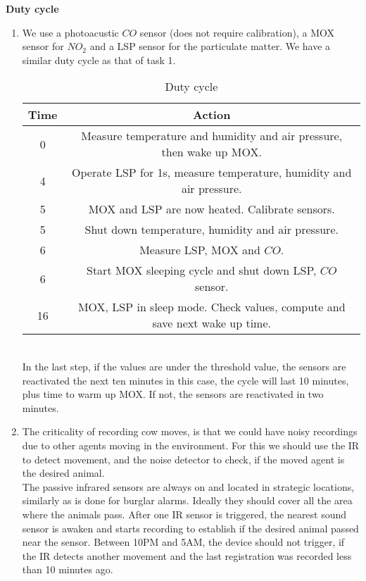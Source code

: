 \documentclass[a4paper, 12pt]{article}
\begin{document}
\begin{exercise}
\textbf{Duty cycle}
\begin{enumerate}
	\item We use a photoacustic $CO$ sensor (does not require calibration),
		a MOX sensor for  $NO_2$ and a LSP
		sensor for the particulate matter. We have a similar duty cycle as that
		of task 1.\\
	\begin{table}[htpb]
		\centering
		\caption{Duty cycle}
		\label{tab:label}
		\begin{tabular}{c | c}
			Time & Action\\
		\hline
		0 & Measure temperature and humidity and air pressure, then wake up MOX.\\
		4 & Operate LSP for 1s, measure temperature, humidity and air pressure.\\
		5 & MOX and LSP are now heated. Calibrate sensors.\\
		5 &  Shut down
		temperature, humidity and air pressure.\\
		6 & Measure LSP, MOX and $CO$. \\
		6 & Start MOX sleeping cycle and shut down LSP, $CO$ sensor.\\
		16 & MOX, LSP in sleep mode. Check values, compute and save next wake up
		time. \\
		\end{tabular}
	\end{table}\\
		In the last step, if the values are under
		the threshold value, the sensors are reactivated the next ten minutes
		in this case, the cycle will last 10 minutes, plus time to warm up MOX.
		If not, the sensors are reactivated in two minutes.  
	\item The criticality of recording cow moves, is that we could have noisy
	recordings due to other agents moving in the environment. For this we
	should use the IR to detect movement, and the noise detector to check, if
	the moved agent is the desired animal. \\
	The passive infrared sensors are always on and located in
	strategic locations, similarly as is done for burglar alarms. Ideally they
	should cover all the area where the animals pass. After one IR sensor is triggered, the nearest
	sound sensor is awaken and starts recording to establish if the desired
	animal passed near the sensor. Between 10PM and 5AM, the device should not
	trigger, if the IR detects another movement and the last registration
	was recorded less than 10 minutes ago. 
\end{enumerate}


\end{exercise}
\end{document}

